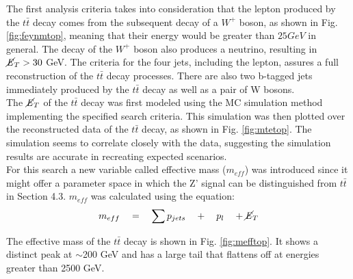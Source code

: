 \documentclass[runningheads,a4paper]{llncs}
\begin{document}
The first analysis criteria takes into consideration that the lepton produced by the $t\bar{t}$ decay comes from the subsequent decay of a $W^+$ boson, as shown in Fig. \ref{fig:feynmtop}, meaning that their energy would be greater than $25 GeV$ in general. The decay of the $W^+$ boson also produces a neutrino, resulting in $\cancel{\it{E}}_{T} > 30$ GeV. The criteria for the four jets, including the lepton, assures a full reconstruction of the $t\bar{t}$ decay processes. There are also two b-tagged jets immediately produced by the $t\bar{t}$ decay as well as a pair of W bosons.\\

The $\cancel{\it{E}}_{T}$ of the $t\bar{t}$ decay was first modeled using the MC simulation method implementing the specified search criteria. This simulation was then plotted over the reconstructed data of the $t\bar{t}$ decay, as shown in Fig. \ref{fig:mtetop}. The simulation seems to correlate closely with the data, suggesting the simulation results are accurate in recreating expected scenarios.\\

For this search a new variable called effective mass (${m}_{eff}$) was introduced since it might offer a parameter space in which the Z' signal can be distinguished from $t\bar{t}$ in Section 4.3. ${m}_{eff}$ was calculated using the equation:\\

\begin{equation}
{ m }_{ eff }\quad =\quad \sum { { p }_{ jets } } \quad +\quad { p }_{ l }\quad + \cancel{\it{E}}_{T}
\end{equation}

The effective mass of the $t\bar{t}$ decay is shown in Fig. \ref{fig:mefftop}. It shows a distinct peak at $\sim$200 GeV and has a large tail that flattens off at energies greater than 2500 GeV.
\end{document}
